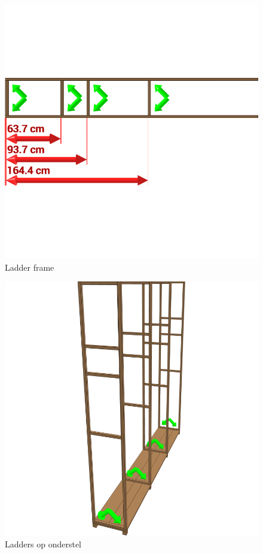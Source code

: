 \documentclass{article}
\begin{document}
\begin{figure}[h!]
    \centering
    \includegraphics[width=\textwidth]{scene 3 - ladder.png}
    \caption{Ladder frame}
\end{figure}

\begin{figure}[h!]
    \centering
    \includegraphics[width=\textwidth]{scene 4 - geraamte.png}
    \caption{Ladders op onderstel}
\end{figure}
\end{document}

